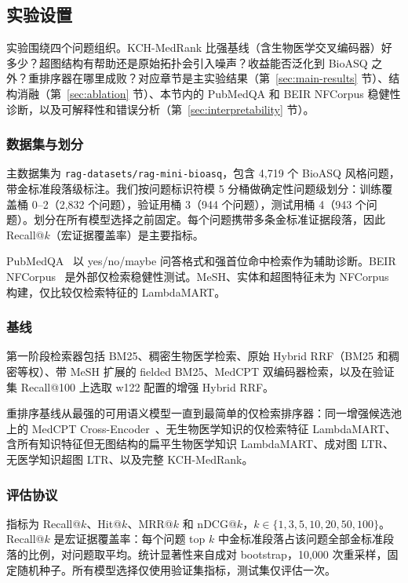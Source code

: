 \subsection{实验设置}

实验围绕四个问题组织。KCH-MedRank 比强基线（含生物医学交叉编码器）好多少？超图结构有帮助还是原始拓扑会引入噪声？收益能否泛化到 BioASQ 之外？重排序器在哪里成败？对应章节是主实验结果（第~\ref{sec:main-results} 节）、结构消融（第~\ref{sec:ablation} 节）、本节内的 PubMedQA 和 BEIR NFCorpus 稳健性诊断，以及可解释性和错误分析（第~\ref{sec:interpretability} 节）。

\subsubsection{数据集与划分}

主数据集为 \texttt{rag-datasets/rag-mini-bioasq}，包含 4,719 个 BioASQ 风格问题，带金标准段落级标注。我们按问题标识符模 5 分桶做确定性问题级划分：训练覆盖桶 0--2（2,832 个问题），验证用桶 3（944 个问题），测试用桶 4（943 个问题）。划分在所有模型选择之前固定。每个问题携带多条金标准证据段落，因此 Recall@$k$（宏证据覆盖率）是主要指标。

PubMedQA~\citep{jin2019pubmedqa} 以 yes/no/maybe 问答格式和强首位命中检索作为辅助诊断。BEIR NFCorpus~\citep{thakur2021beir} 是外部仅检索稳健性测试。MeSH、实体和超图特征未为 NFCorpus 构建，仅比较仅检索特征的 LambdaMART。

\subsubsection{基线}

第一阶段检索器包括 BM25、稠密生物医学检索、原始 Hybrid RRF（BM25 和稠密等权）、带 MeSH 扩展的 fielded BM25、MedCPT 双编码器检索，以及在验证集 Recall@100 上选取 w122 配置的增强 Hybrid RRF。

重排序基线从最强的可用语义模型一直到最简单的仅检索排序器：同一增强候选池上的 MedCPT Cross-Encoder~\citep{jin2023medcpt}、无生物医学知识的仅检索特征 LambdaMART、含所有知识特征但无图结构的扁平生物医学知识 LambdaMART、成对图 LTR、无医学知识超图 LTR、以及完整 KCH-MedRank。

\subsubsection{评估协议}

指标为 Recall@$k$、Hit@$k$、MRR@$k$ 和 nDCG@$k$，$k \in \{1,3,5,10,20,50,100\}$。Recall@$k$ 是宏证据覆盖率：每个问题 top $k$ 中金标准段落占该问题全部金标准段落的比例，对问题取平均。统计显著性来自成对 bootstrap，10,000 次重采样，固定随机种子。所有模型选择仅使用验证集指标，测试集仅评估一次。

